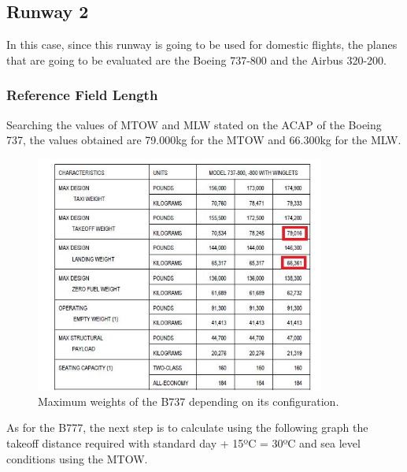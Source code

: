 		\subsection{Runway 2}
		In this case, since this runway is going to be used for domestic flights, the planes that are going to be evaluated are the Boeing 737-800 and the Airbus 320-200.
		
		\subsubsection{Reference Field Length}
		Searching the values of MTOW and MLW stated on the ACAP of the Boeing 737, the values obtained are 79.000kg for the MTOW and 66.300kg for the MLW.
		
		\begin{figure}[H]
			\centering
			\includegraphics[clip, trim=0cm 0cm 0cm 0cm, width=0.85\textwidth]{./images/B737/B737MTOW}
			\caption{Maximum weights of the B737 depending on its configuration.} %
			\label{} %
		\end{figure}
	
		As for the B777, the next step is to calculate using the following graph the takeoff distance required with standard day + 15ºC = 30ºC and sea level conditions using the MTOW.
		
